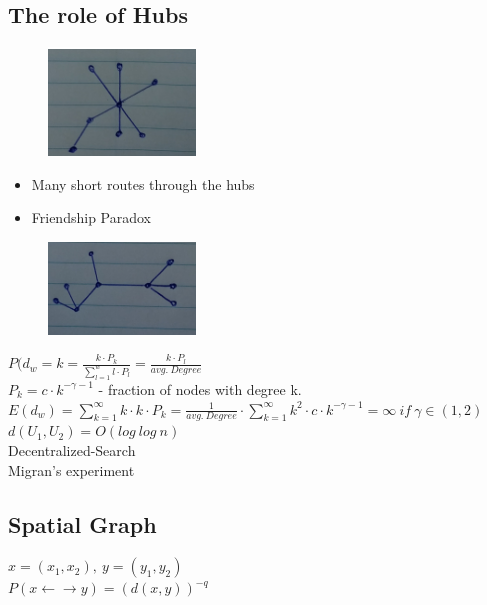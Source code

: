 \documentclass[12pt]{scrartcl}
\begin{document}
\subsection{The role of Hubs}
\begin{figure}[h]
	\centering
	\includegraphics[width=0.35\textwidth]{./images/fig8.jpg} 
\end{figure}

\begin{itemize}
\item Many short routes through the hubs
\item Friendship Paradox
\end{itemize}

\begin{figure}[h]
	\centering
	\includegraphics[width=0.35\textwidth]{./images/fig9.jpg} 
\end{figure}
\noindent$P(d_ {w} = k = \frac{k\cdot P_ {k}}{\sum_{l=1}^{w} l\cdot P_{l}} = \frac{k\cdot P_{l}}{avg.\ Degree}$\\
$P_{k} = c\cdot k^{-\gamma - 1 }$ - fraction of nodes with degree k.\\
$E(d_{w}) = \sum\limits_{k=1}^\infty k\cdot k\cdot P_{k} = \frac{1}{avg.\ Degree}\cdot \sum\limits_{k=1}^\infty k^{2}\cdot c\cdot k^{-\gamma - 1} = \infty\ if\ \gamma \in (1,2)$\\
$d(U_{1}, U_{2}) = O(log\ log\ n)$\\

\noindent Decentralized-Search\\
Migran's experiment

\subsection{Spatial Graph}
$x = (x_ {1}, x_{2}),\ y = (y_{1},y_{2})$\\
$P(x \gets \to y) = (d(x,y))^{-q}$
\end{document}
